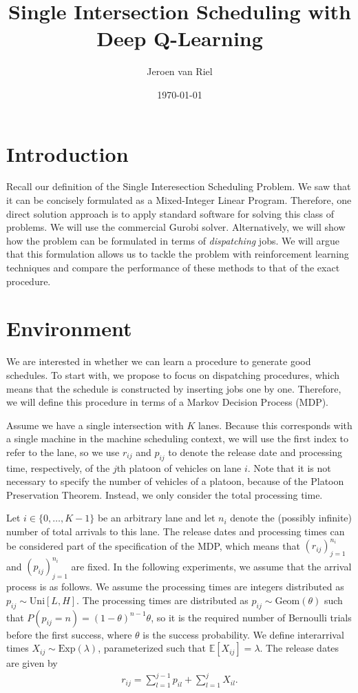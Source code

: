 \documentclass{article}
\title{Single Intersection Scheduling with Deep Q-Learning}
\author{Jeroen van Riel}
\date{\monthyeardate\today}
\theoremstyle{definition}
\theoremstyle{plain}
\begin{document}
\maketitle

\section{Introduction}

Recall our definition of the Single Interesection Scheduling Problem. We saw
that it can be concisely formulated as a Mixed-Integer Linear Program.
Therefore, one direct solution approach is to apply standard software for
solving this class of problems. We will use the commercial Gurobi solver.
Alternatively, we will show how the problem can be formulated in terms of
\textit{dispatching} jobs. We will argue that this formulation allows us to
tackle the problem with reinforcement learning techniques and compare the
performance of these methods to that of the exact procedure.

\section{Environment}

We are interested in whether we can learn a procedure to generate good
schedules. To start with, we propose to focus on dispatching procedures, which
means that the schedule is constructed by inserting jobs one by one. Therefore,
we will define this procedure in terms of a Markov Decision Process (MDP).

Assume we have a single intersection with $K$ lanes. Because this corresponds
with a single machine in the machine scheduling context, we will use the first
index to refer to the lane, so we use $r_{ij}$ and $p_{ij}$ to denote the
release date and processing time, respectively, of the $j$th platoon of vehicles
on lane $i$. Note that it is not necessary to specify the number of vehicles of
a platoon, because of the Platoon Preservation Theorem. Instead, we only
consider the total processing time.

Let $i \in \{0, \dots, K - 1\}$ be an arbitrary lane and let $n_{i}$ denote the
(possibly infinite) number of total arrivals to this lane. The release dates and
processing times can be considered part of the specification of the MDP, which
means that $(r_{ij})_{j=1}^{n_{i}}$ and $(p_{ij})_{j=1}^{n_{i}}$ are fixed. In
the following experiments, we assume that the arrival process is as follows.
We assume the processing times are integers distributed as $p_{ij} \sim \text{Uni}[L, H]$.
{\color{gray}
The processing times are distributed as $p_{ij} \sim \text{Geom}(\theta)$ such
that $P(p_{ij} = n) = (1-\theta)^{n-1}\theta$, so it is the required number of
Bernoulli trials before the first success, where $\theta$ is the success
probability.
}
We define interarrival times $X_{ij} \sim \text{Exp}(\lambda)$, parameterized
such that $\mathbb{E}[X_{ij}] = \lambda$. The release dates are given by
\begin{align}
r_{ij} = \sum_{l=1}^{j-1} p_{il} + \sum_{l=1}^{j} X_{il} .
\end{align}
\end{document}

